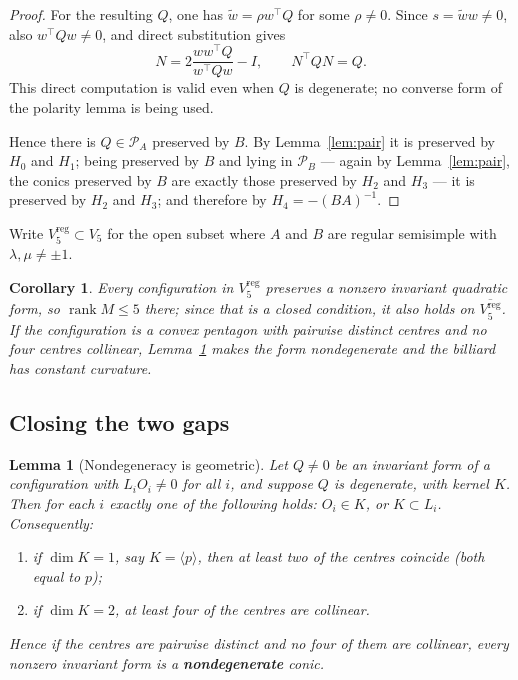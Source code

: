 \documentclass[11pt,a4paper]{article}
\theoremstyle{plain}
\newtheorem{lemma}[theorem]{Lemma}
\newtheorem{corollary}[theorem]{Corollary}
\theoremstyle{definition}
\theoremstyle{remark}
\newcommand{\rk}{\operatorname{rank}}
\begin{document}
\begin{proof}
For the resulting $Q$, one has $\tilde w=\rho w^\top Q$ for some $\rho\neq0$.
Since $s=\tilde ww\neq0$, also $w^\top Qw\neq0$, and direct substitution gives
\[
 N=2\frac{w w^\top Q}{w^\top Qw}-I,\qquad N^\top QN=Q.
\]
This direct computation is valid even when $Q$ is degenerate; no converse form of
the polarity lemma is being used.

Hence there is $Q\in\mathcal{P}_A$ preserved by $B$. By Lemma~\ref{lem:pair} it is
preserved by $H_0$ and $H_1$; being preserved by $B$ and lying in
$\mathcal{P}_B$ --- again by Lemma~\ref{lem:pair}, the conics preserved by $B$ are
exactly those preserved by $H_2$ and $H_3$ --- it is preserved by $H_2$ and $H_3$;
and therefore by $H_4=-(BA)^{-1}$.
\end{proof}

Write $V_5^{\mathrm{reg}}\subset V_5$ for the open subset where $A$ and $B$ are
regular semisimple with $\lambda,\mu\neq\pm1$.

\begin{corollary}\label{cor:closed}
Every configuration in $V_5^{\mathrm{reg}}$ preserves a nonzero invariant quadratic
form, so $\rk M\le5$ there; since that is a closed condition, it also holds on
$\overline{V_5^{\mathrm{reg}}}$. If the configuration is a convex pentagon with
pairwise distinct centres and no four centres collinear, Lemma~\ref{lem:nondeg}
makes the form nondegenerate and the billiard has constant curvature.
\end{corollary}

\subsection{Closing the two gaps}

\begin{lemma}[Nondegeneracy is geometric]\label{lem:nondeg}
Let $Q\neq0$ be an invariant form of a configuration with $L_iO_i\neq0$ for all
$i$, and suppose $Q$ is degenerate, with kernel $K$. Then for each $i$
\emph{exactly one} of the following holds: $O_i\in K$, or $K\subset L_i$.
Consequently:
\begin{enumerate}[label=\textup{(\roman*)},nosep]
  \item if $\dim K=1$, say $K=\langle p\rangle$, then at least two of the centres
        coincide \textup{(}both equal to $p$\textup{)};
  \item if $\dim K=2$, at least four of the centres are collinear.
\end{enumerate}
Hence if the centres are pairwise distinct and no four of them are collinear,
every nonzero invariant form is a \textbf{nondegenerate} conic.
\end{lemma}
\end{document}
